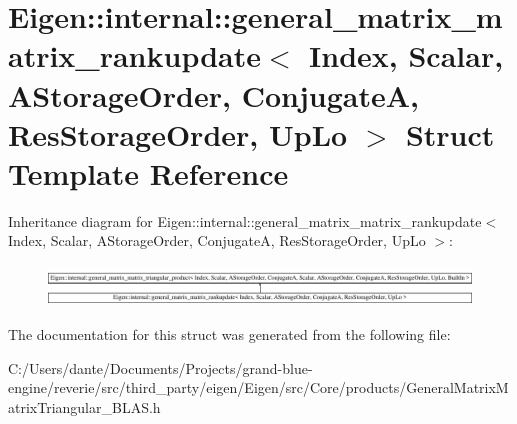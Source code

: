 \hypertarget{struct_eigen_1_1internal_1_1general__matrix__matrix__rankupdate}{}\section{Eigen\+::internal\+::general\+\_\+matrix\+\_\+matrix\+\_\+rankupdate$<$ Index, Scalar, A\+Storage\+Order, ConjugateA, Res\+Storage\+Order, Up\+Lo $>$ Struct Template Reference}
\label{struct_eigen_1_1internal_1_1general__matrix__matrix__rankupdate}
Inheritance diagram for Eigen\+::internal\+::general\+\_\+matrix\+\_\+matrix\+\_\+rankupdate$<$ Index, Scalar, A\+Storage\+Order, ConjugateA, Res\+Storage\+Order, Up\+Lo $>$\+:\begin{figure}[H]
\begin{center}
\leavevmode
\includegraphics[height=1.101278cm]{struct_eigen_1_1internal_1_1general__matrix__matrix__rankupdate}
\end{center}
\end{figure}


The documentation for this struct was generated from the following file\+:\begin{DoxyCompactItemize}
\item 
C\+:/\+Users/dante/\+Documents/\+Projects/grand-\/blue-\/engine/reverie/src/third\+\_\+party/eigen/\+Eigen/src/\+Core/products/General\+Matrix\+Matrix\+Triangular\+\_\+\+B\+L\+A\+S.\+h\end{DoxyCompactItemize}
